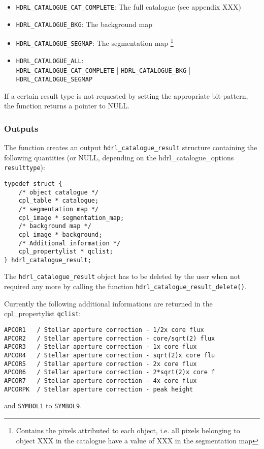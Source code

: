 \begin{itemize}
\item \verb+HDRL_CATALOGUE_CAT_COMPLETE+: The full catalogue (see
  appendix XXX)
\item \verb+HDRL_CATALOGUE_BKG+: The background map
\item \verb+HDRL_CATALOGUE_SEGMAP+: The segmentation map
  \footnote{Contains the pixels attributed to each object, i.e. all
    pixels belonging to object XXX in the catalogue have a value of
    XXX in the segmentation map}
\item \verb+HDRL_CATALOGUE_ALL+:\\  \verb+HDRL_CATALOGUE_CAT_COMPLETE+ |
  \verb+HDRL_CATALOGUE_BKG+ | \verb+HDRL_CATALOGUE_SEGMAP+  
\end{itemize}

If a certain result type is not requested by setting the appropriate
bit-pattern, the function returns a pointer to NULL.

\subsubsection{Outputs}

The function creates an output \verb+hdrl_catalogue_result+ structure
containing the following quantities (or NULL, depending on the
hdrl\_catalogue\_options \verb+resulttype+):

\begin{lstlisting}
typedef struct {
    /* object catalogue */
    cpl_table * catalogue;
    /* segmentation map */
    cpl_image * segmentation_map;
    /* background map */
    cpl_image * background;
    /* Additional information */
    cpl_propertylist * qclist;
} hdrl_catalogue_result;
\end{lstlisting}

The \verb+hdrl_catalogue_result+ object has to be deleted by the user
when not required any more by calling the function
\verb+hdrl_catalogue_result_delete()+.

Currently the following additional informations are returned in the
cpl\_propertylist \verb+qclist+:
{\footnotesize
\begin{verbatim}
APCOR1   / Stellar aperture correction - 1/2x core flux
APCOR2   / Stellar aperture correction - core/sqrt(2) flux
APCOR3   / Stellar aperture correction - 1x core flux
APCOR4   / Stellar aperture correction - sqrt(2)x core flu
APCOR5   / Stellar aperture correction - 2x core flux
APCOR6   / Stellar aperture correction - 2*sqrt(2)x core f
APCOR7   / Stellar aperture correction - 4x core flux
APCORPK  / Stellar aperture correction - peak height
\end{verbatim}
}
and \verb+SYMBOL1+ to \verb+SYMBOL9+. 

